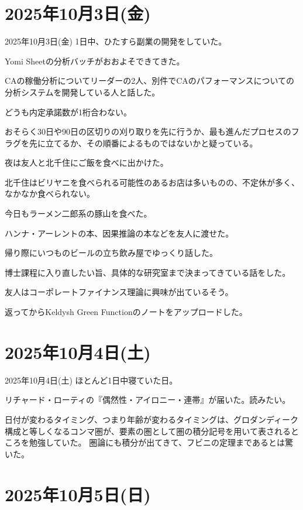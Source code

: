\documentclass[dvipdfmx, autodetect-engine, aspectratio=169, 10.5pt]{beamer}
\begin{document}
\section{2025年10月3日(金)}

\begin{frame}{2025年10月3日(金)}
	1日中、ひたすら副業の開発をしていた。

	Yomi Sheetの分析バッチがおおよそできてきた。

	CAの稼働分析についてリーダーの2人、別件でCAのパフォーマンスについての分析システムを開発している人と話した。

	どうも内定承諾数が1桁合わない。

	おそらく30日や90日の区切りの刈り取りを先に行うか、最も進んだプロセスのフラグを先に立てるか、その順番によるものではないかと疑っている。

	夜は友人と北千住にご飯を食べに出かけた。

	北千住はビリヤニを食べられる可能性のあるお店は多いものの、不定休が多く、なかなか食べられない。

	今日もラーメン二郎系の豚山を食べた。

	ハンナ・アーレントの本、因果推論の本などを友人に渡せた。

	帰り際にいつものビールの立ち飲み屋でゆっくり話した。

	博士課程に入り直したい旨、具体的な研究室まで決まってきている話をした。

	友人はコーポレートファイナンス理論に興味が出ているそう。

	返ってからKeldysh Green Functionのノートをアップロードした。
\end{frame}

\section{2025年10月4日(土)}

\begin{frame}{2025年10月4日(土)}
	ほとんど1日中寝ていた日。

	リチャード・ローティの『偶然性・アイロニー・連帯』が届いた。読みたい。

	日付が変わるタイミング、つまり年齢が変わるタイミングは、グロダンディーク構成と等しくなるコンマ圏が、要素の圏として圏の積分記号を用いて表されるところを勉強していた。
	圏論にも積分が出てきて、フビニの定理まであるとは驚いた。
\end{frame}

\section{2025年10月5日(日)}
\end{document}
